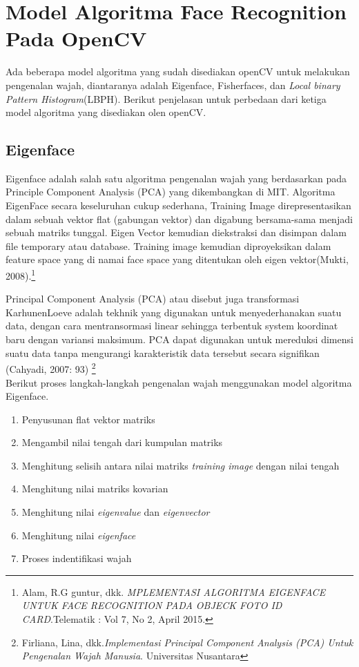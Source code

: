 \newpage
\chapter{Model Algoritma  Face Recognition Pada OpenCV}
Ada beberapa model algoritma yang sudah disediakan openCV untuk melakukan pengenalan wajah, diantaranya adalah
Eigenface, Fisherfaces, dan \emph{Local binary Pattern Histogram}(LBPH). Berikut penjelasan untuk perbedaan dari ketiga model algoritma yang disediakan olen openCV.
\section{Eigenface}

Eigenface adalah salah satu algoritma pengenalan wajah yang berdasarkan pada Principle Component Analysis (PCA) yang dikembangkan di MIT.
Algoritma EigenFace secara keseluruhan cukup sederhana, Training Image direpresentasikan dalam sebuah vektor flat (gabungan vektor) dan digabung
bersama-sama menjadi sebuah matriks tunggal. Eigen Vector kemudian diekstraksi dan disimpan dalam file temporary atau database. Training image
kemudian diproyeksikan dalam feature space yang di namai face space yang ditentukan oleh eigen vektor(Mukti, 2008).\footnote{Alam, R.G guntur, dkk.
\emph{MPLEMENTASI ALGORITMA EIGENFACE UNTUK FACE RECOGNITION PADA OBJECK FOTO ID CARD}.Telematik : Vol 7, No 2, April 2015.}

Principal Component Analysis (PCA) atau disebut juga transformasi KarhunenLoeve adalah tekhnik yang digunakan untuk menyederhanakan suatu data, dengan cara mentransormasi linear sehingga terbentuk
system koordinat baru dengan variansi maksimum. PCA dapat digunakan untuk mereduksi dimensi suatu data tanpa mengurangi karakteristik data tersebut secara signifikan (Cahyadi, 2007: 93)
\footnote{Firliana, Lina, dkk.\emph{Implementasi Principal Component Analysis (PCA) Untuk Pengenalan Wajah Manusia}. Universitas Nusantara}\\

Berikut proses langkah-langkah pengenalan wajah menggunakan model algoritma Eigenface.
\begin{enumerate}[1. ]
    \item Penyusunan flat vektor matriks
    \item Mengambil nilai tengah dari kumpulan matriks
    \item Menghitung selisih antara nilai matriks \emph{training image} dengan nilai tengah
    \item Menghitung nilai matriks kovarian
    \item Menghitung nilai \emph{eigenvalue} dan \emph{eigenvector}
    \item Menghitung nilai \emph{eigenface}
    \item Proses indentifikasi wajah 
\end{enumerate}

